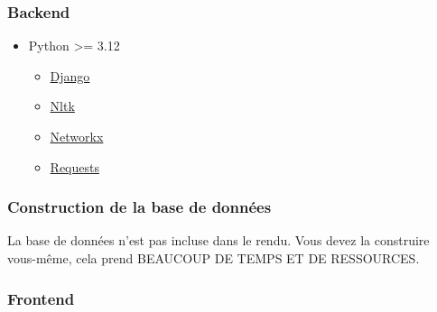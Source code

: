 \subsubsection{Backend}\label{backend}

\begin{itemize}
\tightlist
\item
  Python \textgreater= 3.12

  \begin{itemize}
  \tightlist
  \item
    \href{https://www.djangoproject.com/}{Django}
  \item
    \href{https://www.nltk.org/}{Nltk}
  \item
    \href{https://networkx.org/}{Networkx}
  \item
    \href{https://docs.python-requests.org/en/master/}{Requests}
  \end{itemize}
\end{itemize}

\begin{Shaded}
\begin{Highlighting}[]
\end{Highlighting}
\end{Shaded}

\subsubsection{Construction de la base de
données}\label{construction-de-la-base-de-donnuxe9es}

La base de données n'est pas incluse dans le rendu. Vous devez la
construire vous-même, cela prend BEAUCOUP DE TEMPS ET DE RESSOURCES.

\begin{Shaded}
\begin{Highlighting}[]
\end{Highlighting}
\end{Shaded}

\subsubsection{Frontend}\label{frontend}

